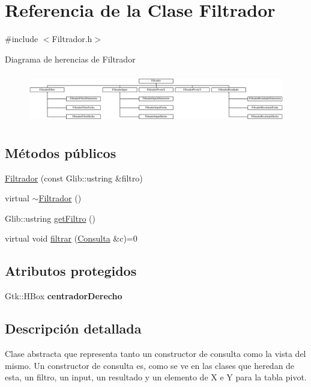 \hypertarget{classFiltrador}{\section{\-Referencia de la \-Clase \-Filtrador}
\label{classFiltrador}
}


{\ttfamily \#include $<$\-Filtrador.\-h$>$}

\-Diagrama de herencias de \-Filtrador\begin{figure}[H]
\begin{center}
\leavevmode
\includegraphics[height=2.209945cm]{classFiltrador}
\end{center}
\end{figure}
\subsection*{\-Métodos públicos}
\begin{DoxyCompactItemize}
\item 
\hyperlink{classFiltrador_a49a38d95ab4cd07bf57a90debe0f9474}{\-Filtrador} (const \-Glib\-::ustring \&filtro)
\item 
virtual \hyperlink{classFiltrador_a85782ed4dd9ca143369f16de7798cb2f}{$\sim$\-Filtrador} ()
\item 
\-Glib\-::ustring \hyperlink{classFiltrador_a652586677727ae345d0f3b1dd6edf7eb}{get\-Filtro} ()
\item 
virtual void \hyperlink{classFiltrador_a5c0739dd669ef0de7f2624c77beb14f0}{filtrar} (\hyperlink{classConsulta}{\-Consulta} \&c)=0
\end{DoxyCompactItemize}
\subsection*{\-Atributos protegidos}
\begin{DoxyCompactItemize}
\item 
\hypertarget{classFiltrador_ac49e35712d9fbbf76930ef14652691f7}{\-Gtk\-::\-H\-Box {\bfseries centrador\-Derecho}}\label{classFiltrador_ac49e35712d9fbbf76930ef14652691f7}

\end{DoxyCompactItemize}


\subsection{\-Descripción detallada}
\-Clase abstracta que representa tanto un constructor de consulta como la vista del mismo. \-Un constructor de consulta es, como se ve en las clases que heredan de esta, un filtro, un input, un resultado y un elemento de \-X e \-Y para la tabla pivot. 

